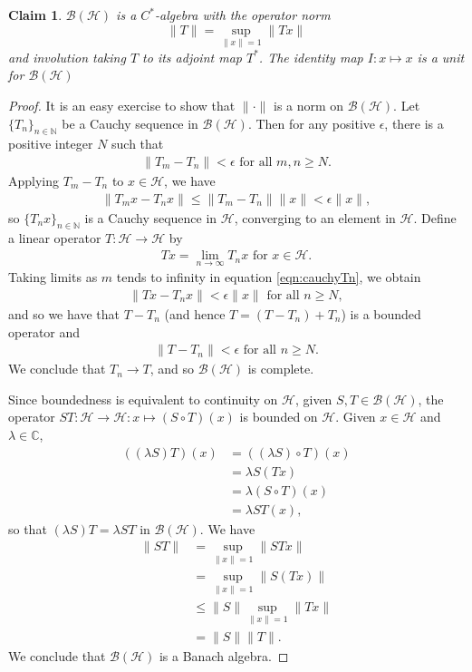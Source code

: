 \documentclass[12pt,a4paper]{report}
\theoremstyle{plain}
\newtheorem*{claim}{Claim}
\theoremstyle{definition}
\newcommand{\1}{\mathbbm{1}}
\newcommand{\C}{\mathbb{C}}
\newcommand{\N}{\mathbb{N}}
\renewcommand{\H}{\mathcal{H}}
\newcommand{\B}{\mathcal{B}}
\newcommand{\BH}{\mathcal{\B(\H)}}
\begin{document}
\begin{claim} $\B(\H)$ is a $C^\ast$-algebra with the operator norm 
\[
	\|T\|= \sup_{\|x\|=1}{\|Tx\|}
\]
and involution taking $T$ to its adjoint map $T^\ast$. 
The identity map $I:x\mapsto x$ is a unit for $\BH$
\end{claim}
\begin{proof}
	It is an easy exercise to show that $\|\cdot\|$ is a norm on $\BH$. Let $\{T_n\}_{n\in\N}$ be a 
	Cauchy sequence in $\BH$. Then for any positive $\epsilon$, there is a positive integer $N$ such 
	that 
	\begin{align*}
		\|T_m-T_n\| < \epsilon \mbox{ for all } m,n \geq N.
	\end{align*}
	Applying $T_m-T_n$ to $x \in \H$, we have 
	\begin{align}\label{eqn:cauchyTn}
		\|T_mx-T_nx\| \leq \|T_m-T_n\| \|x\| < \epsilon \|x\|,
	\end{align}
	so $\{T_nx\}_{n\in\N}$ is a Cauchy sequence in $\H$, converging to an element in $\H$.
	Define a linear operator $T:\H \to \H$ by 
	\begin{align*}
		Tx= \lim_{n\to\infty}{T_nx} \mbox{ for } x \in \H.
	\end{align*}
	Taking limits as $m$ tends to infinity in equation \eqref{eqn:cauchyTn}, we obtain
	\begin{align*}
		\|Tx-T_nx\| < \epsilon \|x\| \mbox{ for all }n \geq N,
	\end{align*}
	and so we have that $T-T_n$ (and hence $T=(T-T_n)+T_n$) is a bounded operator and  
	\begin{align*}
		\|T-T_n\| <\epsilon \mbox{ for all }n \geq N.
	\end{align*}
	We conclude that $T_n \to T$, and so $\BH$ is complete.
	
	Since boundedness is equivalent to continuity on $\H$, given $S,T\in\BH$, the operator 
	$ST:\H \to \H: x \mapsto (S\circ T)(x)$ is bounded on $\H$.
	Given $x\in\H$ and $\lambda\in\C$, 
	\begin{align*}
			((\lambda S)T)(x)
		&=	((\lambda S)\circ T)(x)												\\
		&=	\lambda S(Tx)														\\
		&=	\lambda (S\circ T)(x)												\\
		&=	\lambda ST(x),
	\end{align*} 
	so that $(\lambda S)T = \lambda ST$ in $\BH$. We have 
	\begin{align*}
				\|ST\|
		&=		\sup_{\|x\|=1}{\|STx\|} 										\\
		&=		\sup_{\|x\|=1}{\|S(Tx)\|} 										\\
		&\leq	\|S\| \sup_{\|x\|=1}{\|Tx\|} 									\\
		&=		\|S\| \|T\|.
	\end{align*}
	We conclude that $\BH$ is a Banach algebra.
	

\end{proof}
\end{document}
